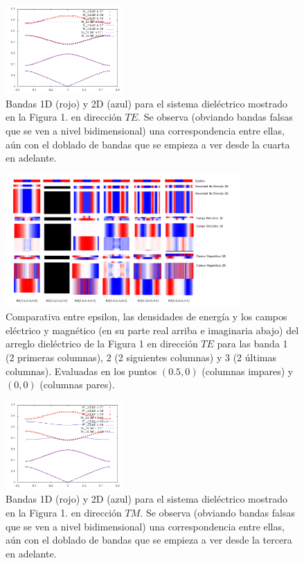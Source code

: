 \documentclass{book}
\begin{document}
\pagebreak
\begin{figure}[ht]
 \centering
   \includegraphics[width=0.40\textwidth]{bandas_te.png}
   \caption{Bandas 1D (rojo) y 2D (azul) para el sistema dieléctrico mostrado en la Figura 1. en dirección $TE$. Se observa (obviando bandas falsas que se ven a nivel bidimensional) una correspondencia entre ellas, aún con el doblado de bandas que se empieza a ver desde la cuarta en adelante.}
\end{figure}
\begin{figure}[ht]
 \centering
   \includegraphics[width=0.80\textwidth]{DirTE.png}
   \caption{Comparativa entre epsilon, las densidades de energía y los campos eléctrico y magnético (en su parte real arriba e imaginaria abajo) del arreglo dieléctrico de la Figura 1 en dirección $TE$ para las banda 1 (2 primeras columnas), 2 (2 siguientes columnas) y 3 (2 últimas columnas). Evaluadas en los puntos $(0.5,0)$ (columnas impares) y $(0,0)$ (columnas pares).}
\end{figure}
\pagebreak

\begin{figure}[ht]
 \centering
   \includegraphics[width=0.40\textwidth]{bandas_tm.png}
   \caption{Bandas 1D (rojo) y 2D (azul) para el sistema dieléctrico mostrado en la Figura 1. en dirección $TM$. Se observa (obviando bandas falsas que se ven a nivel bidimensional) una correspondencia entre ellas, aún con el doblado de bandas que se empieza a ver desde la tercera en adelante.}
\end{figure}
\end{document}
